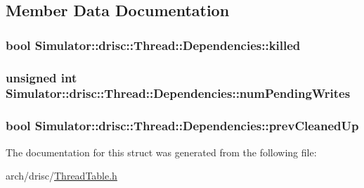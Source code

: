 \subsection{Member Data Documentation}
\hypertarget{struct_simulator_1_1drisc_1_1_thread_1_1_dependencies_a7c4d350166518dc939f086a293b3d512}{
\subsubsection[{killed}]{\setlength{\rightskip}{0pt plus 5cm}bool Simulator\+::drisc\+::\+Thread\+::\+Dependencies\+::killed}}\label{struct_simulator_1_1drisc_1_1_thread_1_1_dependencies_a7c4d350166518dc939f086a293b3d512}
\hypertarget{struct_simulator_1_1drisc_1_1_thread_1_1_dependencies_a681dea9bcbb9eb51ee072b8bb4d55cea}{
\subsubsection[{num\+Pending\+Writes}]{\setlength{\rightskip}{0pt plus 5cm}unsigned int Simulator\+::drisc\+::\+Thread\+::\+Dependencies\+::num\+Pending\+Writes}}\label{struct_simulator_1_1drisc_1_1_thread_1_1_dependencies_a681dea9bcbb9eb51ee072b8bb4d55cea}
\hypertarget{struct_simulator_1_1drisc_1_1_thread_1_1_dependencies_a913f307ebfca3f9359fc13b4cdf71992}{
\subsubsection[{prev\+Cleaned\+Up}]{\setlength{\rightskip}{0pt plus 5cm}bool Simulator\+::drisc\+::\+Thread\+::\+Dependencies\+::prev\+Cleaned\+Up}}\label{struct_simulator_1_1drisc_1_1_thread_1_1_dependencies_a913f307ebfca3f9359fc13b4cdf71992}


The documentation for this struct was generated from the following file\+:\begin{DoxyCompactItemize}
\item 
arch/drisc/\hyperlink{_thread_table_8h}{Thread\+Table.\+h}\end{DoxyCompactItemize}
